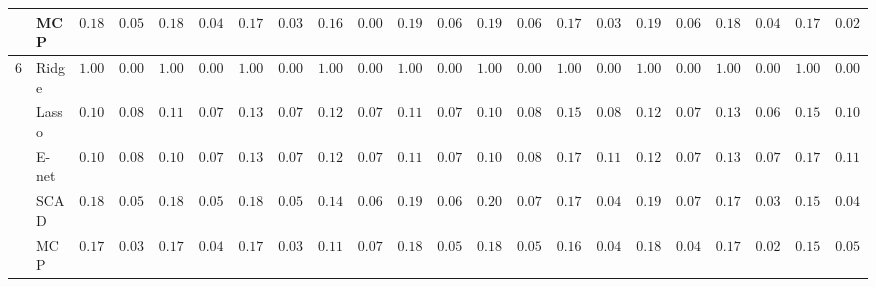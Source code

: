 \begin{tabular}{p{0.2cm}p{1cm}|p{0.6cm}p{0.6cm}|p{0.6cm}p{0.6cm}p{0.6cm}p{0.6cm}p{0.6cm}p{0.6cm}|p{0.6cm}p{0.6cm}p{0.6cm}p{0.6cm}p{0.6cm}p{0.6cm}|p{0.6cm}p{0.6cm}p{0.6cm}p{0.6cm}p{0.6cm}p{0.6cm}}
 & MCP  & $0.1850$ & $0.0524$ & $0.1817$ & $0.0479$ & $0.1767$ & $0.0398$ & $0.1667$ & $0.0000$ & $0.1950$ & $0.0672$ & $0.1950$ & $0.0672$ & $0.1733$ & $0.0328$ & $0.1983$ & $0.0699$ & $0.1817$ & $0.0479$ & $0.1717$ & $0.0286$ \\\hline
6 & Ridge  & $1.0000$ & $0.0000$ & $1.0000$ & $0.0000$ & $1.0000$ & $0.0000$ & $1.0000$ & $0.0000$ & $1.0000$ & $0.0000$ & $1.0000$ & $0.0000$ & $1.0000$ & $0.0000$ & $1.0000$ & $0.0000$ & $1.0000$ & $0.0000$ & $1.0000$ & $0.0000$ \\
 & Lasso  & $0.1050$ & $0.0809$ & $0.1100$ & $0.0793$ & $0.1317$ & $0.0760$ & $0.1200$ & $0.0752$ & $0.1167$ & $0.0768$ & $0.1017$ & $0.0817$ & $0.1567$ & $0.0881$ & $0.1233$ & $0.0735$ & $0.1350$ & $0.0699$ & $0.1550$ & $0.1012$ \\
 & E-net  & $0.1033$ & $0.0813$ & $0.1083$ & $0.0799$ & $0.1300$ & $0.0771$ & $0.1267$ & $0.0715$ & $0.1150$ & $0.0775$ & $0.1000$ & $0.0821$ & $0.1783$ & $0.1142$ & $0.1217$ & $0.0744$ & $0.1350$ & $0.0738$ & $0.1733$ & $0.1134$ \\
 & SCAD  & $0.1850$ & $0.0524$ & $0.1850$ & $0.0524$ & $0.1867$ & $0.0544$ & $0.1400$ & $0.0658$ & $0.1967$ & $0.0644$ & $0.2000$ & $0.0749$ & $0.1750$ & $0.0435$ & $0.1967$ & $0.0726$ & $0.1750$ & $0.0365$ & $0.1550$ & $0.0427$ \\
 & MCP  & $0.1750$ & $0.0365$ & $0.1783$ & $0.0427$ & $0.1733$ & $0.0328$ & $0.1167$ & $0.0768$ & $0.1883$ & $0.0563$ & $0.1850$ & $0.0524$ & $0.1617$ & $0.0440$ & $0.1817$ & $0.0479$ & $0.1717$ & $0.0286$ & $0.1500$ & $0.0503$ \\
\hline 
\end{tabular}


